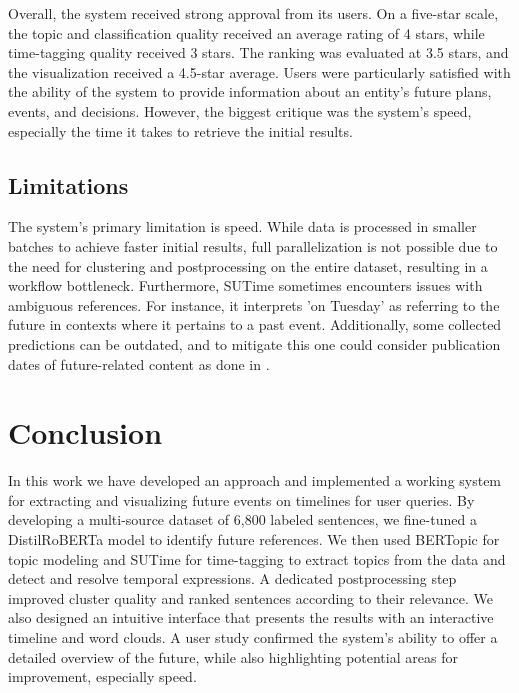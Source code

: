 \documentclass[a4paper,10pt]{report} %
\begin{document}
Overall, the system received strong approval from its users. On a five-star scale, the topic and classification quality received an average rating of 4 stars, while time-tagging quality received 3 stars. The ranking was evaluated at 3.5 stars, and the visualization received a 4.5-star average. Users were particularly satisfied with the ability of the system to provide information about an entity's future plans, events, and decisions. However, the biggest critique was the system's speed, especially the time it takes to retrieve the initial results. 

\section{Limitations}
The system's primary limitation is speed. While data is processed in smaller batches to achieve faster initial results, full parallelization is not possible due to the need for clustering and postprocessing on the entire dataset, resulting in a workflow bottleneck. 
Furthermore, SUTime sometimes encounters issues with ambiguous references. For instance, it interprets 'on Tuesday' as referring to the future in contexts where it pertains to a past event. 
Additionally, some collected predictions can be outdated, and to mitigate this one could consider publication dates of future-related content as done in \cite{yusuke}. 

\chapter{Conclusion}
In this work we have developed an approach and implemented a working system for extracting and visualizing future events on timelines for user queries. By developing a multi-source dataset of 6,800 labeled sentences, we fine-tuned a DistilRoBERTa model to identify future references. We then used BERTopic for topic modeling and SUTime for time-tagging to extract topics from the data and detect and resolve temporal expressions. A dedicated postprocessing step improved cluster quality and ranked sentences according to their relevance. We also designed an intuitive interface that presents the results with an interactive timeline and word clouds. A user study confirmed the system's ability to offer a detailed overview of the future, while also highlighting potential areas for improvement, especially speed.



%

\end{document}
